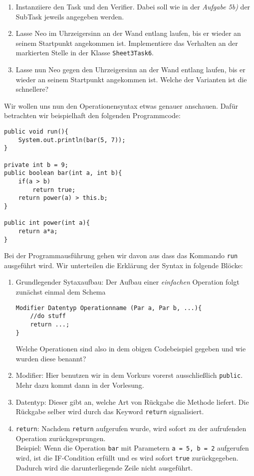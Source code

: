 
\begin{enumerate}
    \item Instanziiere den Task und den Verifier. Dabei soll wie in der \textit{Aufgabe 5b)} der SubTask jeweils angegeben werden.
    \item Lasse Neo im Uhrzeigersinn an der Wand entlang laufen, bis er wieder an seinem Startpunkt angekommen ist.
    Implementiere das Verhalten an der markierten Stelle in der Klasse \lstinline{Sheet3Task6}.
    \item Lasse nun Neo gegen den Uhrzeigersinn an der Wand entlang laufen, bis er wieder an seinem Startpunkt angekommen ist.
    Welche der Varianten ist die schnellere?
\end{enumerate}
\begin{Infobox}[Operationensyntax]
    Wir wollen uns nun den Operationensyntax etwas genauer anschauen. Dafür betrachten wir beispielhaft den folgenden Programmcode:
    \begin{lstlisting}[breaklines=true, numbers=none]
public void run(){
    System.out.println(bar(5, 7));
}

private int b = 9;
public boolean bar(int a, int b){
    if(a > b)
        return true;
    return power(a) > this.b;
}

public int power(int a){
    return a*a;
}
\end{lstlisting}
Bei der Programmausführung gehen wir davon aus dass das Kommando \lstinline{run} ausgeführt wird. Wir unterteilen die Erklärung der Syntax in folgende Blöcke:
\begin{enumerate}[label=\roman*)]
    \item 
    Grundlegender Sytaxaufbau: Der Aufbau einer \textit{einfachen} Operation folgt zunächst einmal dem Schema 
    \begin{lstlisting}
Modifier Datentyp Operationname (Par a, Par b, ...){
    //do stuff
    return ...;
}
    \end{lstlisting}
    Welche Operationen sind also in dem obigen Codebeispiel gegeben und wie wurden diese benannt?
    \item Modifier: Hier benutzen wir in dem Vorkurs vorerst ausschließlich \lstinline{public}. Mehr dazu kommt dann in der Vorlesung.
    \item Datentyp: Dieser gibt an, welche Art von Rückgabe die Methode liefert. Die Rückgabe selber wird durch das Keyword \lstinline{return} signalisiert.
    \item \lstinline{return}:
    Nachdem \lstinline{return} aufgerufen wurde, wird sofort zu der aufrufenden Operation zurückgesprungen.\\
    Beispiel: Wenn die Operation \lstinline{bar} mit Parametern \lstinline{a = 5, b = 2} aufgerufen wird, ist die IF-Condition erfüllt und es wird sofort \lstinline{true} zurückgegeben.
    Dadurch wird die darunterliegende Zeile nicht ausgeführt.
\end{enumerate}

\end{Infobox}
